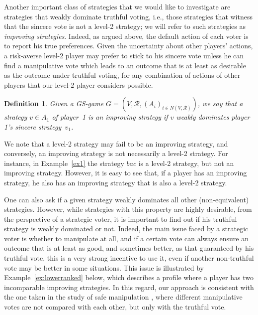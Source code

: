 \documentclass[11pt]{article}
\newtheorem{definition}{Definition}
\newcommand{\calR}{\mathcal{R}}
\begin{document}
Another important class of strategies that we would like to investigate 
are strategies that weakly dominate truthful voting, i.e., those strategies that witness
that the sincere vote is not a level-2 strategy; we will refer to such strategies 
as {\em improving strategies}.
Indeed, as argued above, the default action of each voter 
is to report his true preferences. Given the uncertainty about other players'
actions, a risk-averse level-2 player may prefer to stick to his sincere vote
unless he can find a manipulative vote which leads to an outcome that is at least as desirable
as the outcome under truthful voting, for any combination of actions of other players
that our level-2 player considers possible. 

\begin{definition}
Given a GS-game $G=(V, \calR, (A_i)_{i\in N(V, \calR)})$, we say that a strategy $v\in A_1$ of player~1
is an {\em improving strategy} if $v$ weakly dominates player 1's sincere strategy~$v_1$.
\end{definition}

We note that a level-2 strategy may fail to be an improving strategy, 
and conversely, an improving strategy is not necessarily a level-2 strategy.
For instance, in Example~\ref{ex1} the strategy $bac$
is a level-2 strategy, but not an improving strategy.
However, it is easy to see that, if a player has an improving strategy, he also has an improving strategy
that is also a level-2 strategy. 

One can also ask if a given strategy weakly dominates all other (non-equivalent) strategies. 
However, while strategies with this property are highly desirable, from the perspective
of a strategic voter, it is important to find out if his truthful strategy is weakly dominated or not.
Indeed, the main issue faced
by a strategic voter is whether to manipulate at all, and if a certain vote
can always ensure an outcome that is at least as good, and sometimes better, as that guaranteed by his truthful vote, 
this is a very strong incentive to use it, even if another non-truthful vote may be better
in some situations. 
This issue is illustrated by Example~\ref{ex:lowerranked} below, which 
describes a profile where a player has two incomparable improving strategies.
In this regard, our approach is consistent
with the one taken in the study of safe manipulation \citep{safe2}, where
different manipulative votes are not compared with each other, but only with the truthful vote.
\end{document}
